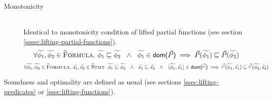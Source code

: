 \begin{description}
    \item[Monotonicity]~\\
    Identical to monotonicity condition of lifted partial functions (see section \ref{sssec:lifting-partial-functions}). %
    \begin{displaymath}
    \forall \widetilde{\phi_1}, \widetilde{\phi_2} \in \textup{\textsc{\ensuremath{\widetilde{\text{F}}}ormula}}.~ 
    \widetilde{\phi_1} \sqsubseteq \widetilde{\phi_2} ~~\wedge~~ \widetilde{\phi_1} \in \textup{\textmd{\textsf{dom($\vec{P}$)}}} 
    \implies 
    \vec{P}(\widetilde{\phi_1}) \sqsubseteq \vec{P}(\widetilde{\phi_2})
    \end{displaymath}
    \textcolor{gray}{
        \begin{displaymath}
        \forall \widetilde{\phi_1}, \widetilde{\phi_2} \in \textup{\textsc{\ensuremath{\widetilde{\text{F}}}ormula}},\, \widetilde{s_1}, \widetilde{s_2} \in \textup{\textsc{\ensuremath{\widetilde{\text{S}}}tmt}}.~ 
        \widetilde{\phi_1} \sqsubseteq \widetilde{\phi_2} ~~\wedge~~ \widetilde{s_1} \sqsubseteq \widetilde{s_2} ~~\wedge~~ \langle \widetilde{\phi_1}, \widetilde{s_1} \rangle \in \textup{\textmd{\textsf{dom($\vec{\vdash}$)}}}
        \implies 
        \vec{\vdash}(\widetilde{\phi_1}, \widetilde{s_1}) \sqsubseteq \vec{\vdash}(\widetilde{\phi_2}, \widetilde{s_2})
        \end{displaymath}
    }
\end{description}

Soundness and optimality are defined as usual (see sections \ref{ssec:lifting-predicates} or \ref{ssec:lifting-functions}).

